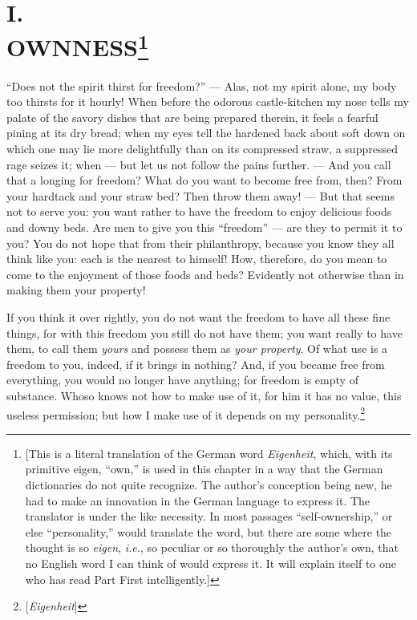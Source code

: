 
\chapter[I. Ownness]{\centering I.\\
OWNNESS\footnote{[This is a literal translation of the German word 
\textit{Eigenheit}, which, with its primitive eigen, ``own,'' is used in 
this chapter in a way that the German dictionaries do not quite recognize. The 
author's conception being new, he had to make an innovation in the German 
language to express it. The translator is under the like necessity. In most 
passages ``self-ownership,'' or else ``personality,'' would translate the 
word, but there are some where the thought is so \textit{eigen}, \textit{i.e.},
so peculiar or so thoroughly the author's own, that no English word I can 
think of would express it. It will explain itself to one who has read Part 
First intelligently.]}}

``Does not the spirit thirst for freedom?'' --- Alas, not my spirit alone, my 
body too thirsts for it hourly! When before the odorous castle-kitchen my nose 
tells my palate of the savory dishes that are being prepared therein, it feels 
a fearful pining at its dry bread; when my eyes tell the hardened back about 
soft down on which one may lie more delightfully than on its compressed straw, 
a suppressed rage seizes it; when --- but let us not follow the pains further. --- And you call that a longing for freedom? What do you want to become free 
from, then? From your hardtack and your straw bed? Then throw them away! --- 
But that seems not to serve you: you want rather to have the freedom to enjoy 
delicious foods and downy beds. Are men to give you this ``freedom'' --- are 
they to permit it to you? You do not hope that from their philanthropy, 
because you know they all think like you: each is the nearest to himself! How, 
therefore, do you mean to come to the enjoyment of those foods and beds? 
Evidently not otherwise than in making them your property!

If you think it over rightly, you do not want the freedom to have all these 
fine things, for with this freedom you still do not have them; you want really 
to have them, to call them \textit{yours} and possess them as \textit{your 
property}. Of what use is a freedom to you, indeed, if it brings in nothing? 
And, if you became free from everything, you would no longer have anything; 
for freedom is empty of substance. Whoso knows not how to make use of it, for 
him it has no value, this useless permission; but how I make use of it depends 
on my personality.\footnote{[\textit{Eigenheit}]}


